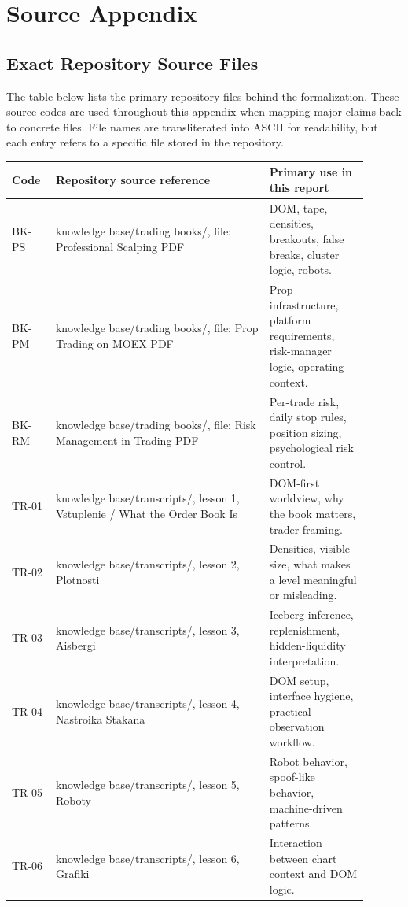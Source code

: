 \section{Source Appendix}

\subsection{Exact Repository Source Files}

The table below lists the primary repository files behind the formalization. These source codes are used throughout this appendix when mapping major claims back to concrete files. File names are transliterated into ASCII for readability, but each entry refers to a specific file stored in the repository.

\begin{longtable}{p{0.11\linewidth}p{0.54\linewidth}p{0.25\linewidth}}
\toprule
\textbf{Code} & \textbf{Repository source reference} & \textbf{Primary use in this report} \\
\midrule
BK-PS & knowledge base/trading books/, file: Professional Scalping PDF & DOM, tape, densities, breakouts, false breaks, cluster logic, robots. \\
BK-PM & knowledge base/trading books/, file: Prop Trading on MOEX PDF & Prop infrastructure, platform requirements, risk-manager logic, operating context. \\
BK-RM & knowledge base/trading books/, file: Risk Management in Trading PDF & Per-trade risk, daily stop rules, position sizing, psychological risk control. \\
TR-01 & knowledge base/transcripts/, lesson 1, Vstuplenie / What the Order Book Is & DOM-first worldview, why the book matters, trader framing. \\
TR-02 & knowledge base/transcripts/, lesson 2, Plotnosti & Densities, visible size, what makes a level meaningful or misleading. \\
TR-03 & knowledge base/transcripts/, lesson 3, Aisbergi & Iceberg inference, replenishment, hidden-liquidity interpretation. \\
TR-04 & knowledge base/transcripts/, lesson 4, Nastroika Stakana & DOM setup, interface hygiene, practical observation workflow. \\
TR-05 & knowledge base/transcripts/, lesson 5, Roboty & Robot behavior, spoof-like behavior, machine-driven patterns. \\
TR-06 & knowledge base/transcripts/, lesson 6, Grafiki & Interaction between chart context and DOM logic. \\

\end{longtable}
